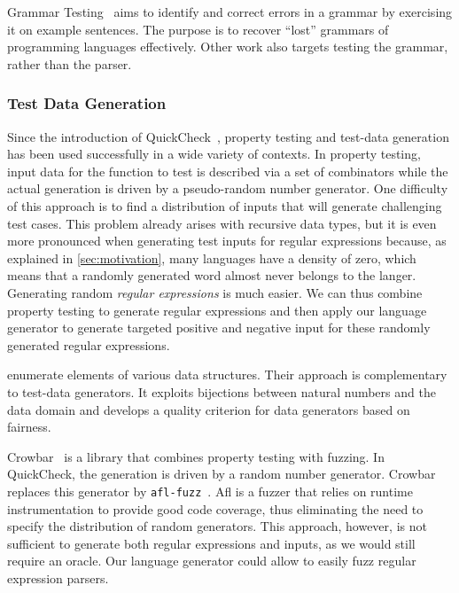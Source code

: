 Grammar Testing~\cite{DBLP:conf/fase/Lammel01} aims to
identify and correct errors in a grammar by exercising it on example
sentences. The purpose is to recover ``lost'' grammars of programming
languages effectively.
Other work \cite{DBLP:conf/compsac/LiJLG04} also targets
testing the grammar, rather than the parser.

\subsubsection*{Test Data Generation}

Since the introduction of
QuickCheck~\cite{DBLP:conf/icfp/ClaessenH00}, property testing and
test-data generation has been used successfully in a wide variety of
contexts.  In property testing, input data for the function to test is
described via a set of combinators while the actual generation is
driven by a pseudo-random number generator. One difficulty of this
approach is to find a distribution of inputs that will
generate challenging test cases. This problem already arises with
recursive data types, but it is even more pronounced when generating
test inputs for regular expressions because, as explained in
\cref{sec:motivation}, many languages have a density of zero, which
means that a randomly generated word almost never belongs to the
langer.  Generating random \emph{regular expressions} is much
easier. We can thus combine property testing to generate regular
expressions and then apply our language generator to generate targeted
positive and negative input for these randomly generated regular
expressions.

\citet{DBLP:journals/jfp/NewFFM17} enumerate elements of various data
structures. Their approach is complementary to test-data
generators. It exploits bijections between natural numbers and the
data domain and develops a quality criterion for data generators based
on fairness.

Crowbar~\cite{crowbar} is a library that combines property testing
with fuzzing.  In QuickCheck, the generation is driven by a random
number generator. Crowbar replaces this generator by
\texttt{afl-fuzz}~\cite{afl}. Afl is a fuzzer that relies on runtime
instrumentation to provide good code coverage, thus eliminating the
need to specify the distribution of random generators.  This approach,
however, is not sufficient to generate both regular expressions and
inputs, as we would still require an oracle. Our language generator
could allow to easily fuzz regular expression parsers.



